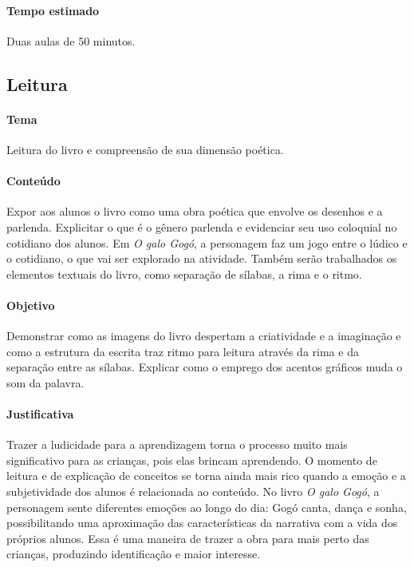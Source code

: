 \documentclass[11pt]{extarticle}
\begin{document}
\paragraph{Tempo estimado} Duas aulas de 50 minutos.


\subsection{Leitura}

\paragraph{Tema} Leitura do livro e compreensão de sua dimensão poética.

\paragraph{Conteúdo} Expor aos alunos o livro como uma obra poética que envolve os desenhos e a parlenda. Explicitar o que é o gênero parlenda e evidenciar seu uso coloquial no cotidiano dos alunos. Em \textit{O galo Gogó}, a personagem faz um jogo entre o lúdico e o cotidiano, o que vai ser explorado na atividade. Também serão trabalhados os elementos textuais do livro, como separação de sílabas, a rima e o ritmo.

\paragraph{Objetivo} Demonstrar como as imagens do livro despertam a criatividade e a imaginação e como a estrutura da escrita traz ritmo para leitura através da rima e da separação entre as sílabas. Explicar como o emprego dos acentos gráficos muda o som da palavra.

\paragraph{Justificativa} Trazer a ludicidade para a aprendizagem torna o processo muito mais significativo para as crianças, pois elas brincam aprendendo. O momento de leitura e de explicação de conceitos se torna ainda mais rico quando a emoção e a subjetividade dos alunos é relacionada ao conteúdo. No livro \textit{O galo Gogó}, a personagem sente diferentes emoções ao longo do dia: Gogó canta, dança e sonha, possibilitando uma aproximação das características da narrativa com a vida dos próprios alunos. Essa é uma maneira de trazer a obra para mais perto das crianças, produzindo identificação e maior interesse.
\end{document}
